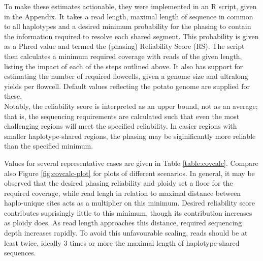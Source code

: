 
To make these estimates actionable, they were implemented in an R script, given in the Appendix.
It takes a read length, maximal length of sequence in common to all haplotypes and a desired minimum probability for the phasing to contain the information required to resolve each shared segment.
This probability is given as a Phred value and termed the (phasing) Reliability Score (RS).
The script then calculates a minimum required coverage with reads of the given length, listing the impact of each of the steps outlined above.
It also has support for estimating the number of required flowcells, given a genome size and ultralong yields per flowcell.
Default values reflecting the potato genome are supplied for these.\\
Notably, the reliability score is interpreted as an upper bound, not as an average; that is, the sequencing requirements are calculated such that even the most challenging regions will meet the specified reliability.
In easier regions with smaller haplotype-shared regions, the phasing may be siginificantly more reliable than the specified minimum. %

Values for several representative cases are given in Table \ref{table:covcalc}.
Compare also Figure \ref{fig:covcalc-plot} for plots of different scenarios.
In general, it may be observed that the desired phasing reliability and ploidy set a floor for the required coverage, while read lengh in relation to maximal distance between haplo-unique sites acts as a multiplier on this minimum.
Desired reliability score contributes suprisingly little to this minimum, though its contribution increases as ploidy does.
As read length approaches this distance, required sequencing depth increases rapidly.
To avoid this unfavourable scaling, reads should be at least twice, ideally 3 times or more the maximal length of haplotype-shared sequences.

